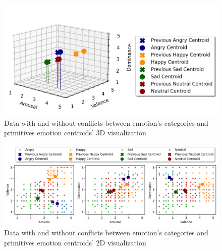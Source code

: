 \begin{figure}[H]
  \centering
  \includegraphics[width=.9\linewidth]{figs/5_data_stratification/strict_conflicts_centroids.png}
  \caption{Data with and without conflicts between emotion's categories and primitives emotion centroids' 3D visualization}
  \label{fig:signalWP}
\end{figure}

\begin{figure}[H]
  \centering
  \includegraphics[width=.9\linewidth]{figs/5_data_stratification/strict_conflicts_centroids_2d.png}
  \caption{Data with and without conflicts between emotion's categories and primitives emotion centroids' 2D visualization}
  \label{fig:signalWP}
\end{figure}




